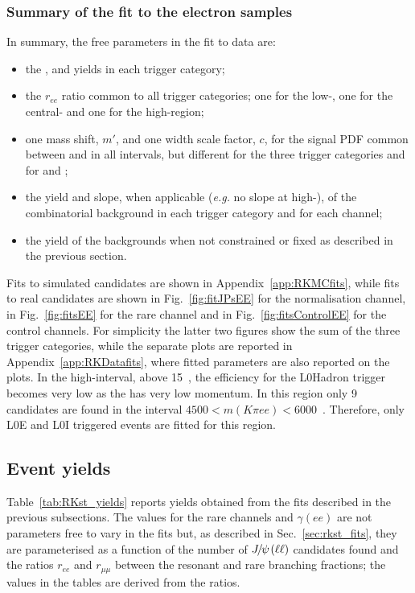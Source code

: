
\subsubsection{Summary of the fit to the electron samples}

In summary, the free parameters in the fit to data are:
%
\begin{itemize}
\item the \BdToKstJPsee, \BdToKstPsiee and \BdToKstGee yields in each trigger category;
\item the $r_{ee}$ ratio common to all trigger categories; one for the low-, one for the central- and one for the high-\qsq region;
\item one mass shift, $m'$, and one width scale factor, $c$, for the signal PDF common between \BdToKstJPsee and \BdToKstee in all intervals,
but different for the three trigger categories and for \BdToKstPsiee and \BdToKstGee;
\item the yield and slope, when applicable (\emph{e.g.} no slope at high-\qsq), of the combinatorial background in each trigger category and for each channel;
\item the yield of the backgrounds when not constrained or fixed as described in the previous section.
\end{itemize}

Fits to simulated \BdToKstJPsee candidates are shown in Appendix~\ref{app:RKMCfits}, while
fits to real candidates are shown in Fig.~\ref{fig:fitJPsEE} for the normalisation channel, in Fig.~\ref{fig:fitsEE} 
for the rare channel and in Fig.~\ref{fig:fitsControlEE} for the control channels.
For simplicity the latter two figures show the sum of the three trigger categories, while the separate plots are
reported in Appendix~\ref{app:RKDatafits}, where fitted parameters are also reported on the plots.
%
In the high-\qsq interval, above 15~\gevgevcccc, the efficiency for the
L0Hadron trigger becomes very low as the \Kstarz has very low momentum.
In this region only 9 candidates are found in the interval $4500 < m(K\pi ee) < 6000$~\mevcc. 
Therefore, only L0E and L0I triggered events are fitted for this region.

\subsection{Event yields}

Table~\ref{tab:RKst_yields} reports yields obtained from the
fits described in the previous subsections. The values for the rare channels and $\gamma(ee)$ are
 not parameters free to vary in the fits but, as described in Sec.~\ref{sec:rkst_fits}, they are parameterised
as a function of the number of $\jpsi(\ell\ell)$ candidates found and the ratios $r_{ee}$ and $r_{\mu\mu}$
between the resonant and rare branching fractions; the values in the tables are derived from the ratios. 

